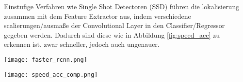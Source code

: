 Einstufige Verfahren wie Single Shot Detectoren (SSD) 
führen die lokalisierung zusammen mit dem Feature Extractor 
aus, indem verschiedene scalierungen/ausmaße der Convolutional 
Layer in den Classifier/Regressor gegeben werden.
Dadurch sind diese wie in Abbildung \ref{fig:speed_acc}
zu erkennen ist, zwar schneller, jedoch auch ungenauer.

\begin{minipage}[t]{0.5\textwidth}
    \centering
    \label{fig:faster_rcnn}
    \texttt{[image: faster\_rcnn.png]}
\end{minipage}
\begin{minipage}[t]{0.5\textwidth}
    \centering
    \label{fig:speed_acc}
    \texttt{[image: speed\_acc\_comp.png]}
\end{minipage}

